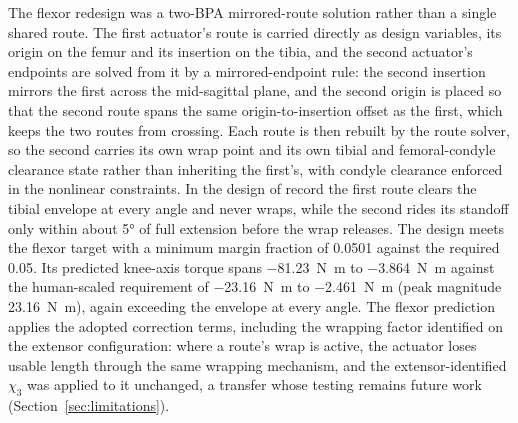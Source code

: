 \documentclass[utf8]{FrontiersinHarvard} %
\begin{document}
The flexor redesign was a two-BPA mirrored-route solution rather than a single shared route. The first actuator's route is carried directly as design variables, its origin on the femur and its insertion on the tibia, and the second actuator's endpoints are solved from it by a mirrored-endpoint rule: the second insertion mirrors the first across the mid-sagittal plane, and the second origin is placed so that the second route spans the same origin-to-insertion offset as the first, which keeps the two routes from crossing. Each route is then rebuilt by the route solver, so the second carries its own wrap point and its own tibial and femoral-condyle clearance state rather than inheriting the first's, with condyle clearance enforced in the nonlinear constraints. In the design of record the first route clears the tibial envelope at every angle and never wraps, while the second rides its standoff only within about \ang{5} of full extension before the wrap releases. The design meets the flexor target with a minimum margin fraction of 0.0501 against the required 0.05. Its predicted knee-axis torque spans \qty{-81.23}{\newton\meter} to \qty{-3.864}{\newton\meter} against the human-scaled requirement of \qty{-23.16}{\newton\meter} to \qty{-2.461}{\newton\meter} (peak magnitude \qty{23.16}{\newton\meter}), again exceeding the envelope at every angle. The flexor prediction applies the adopted correction terms, including the wrapping factor identified on the extensor configuration: where a route's wrap is active, the actuator loses usable length through the same wrapping mechanism, and the extensor-identified $\chi_{3}$ was applied to it unchanged, a transfer whose testing remains future work (Section~\ref{sec:limitations}).
\end{document}
